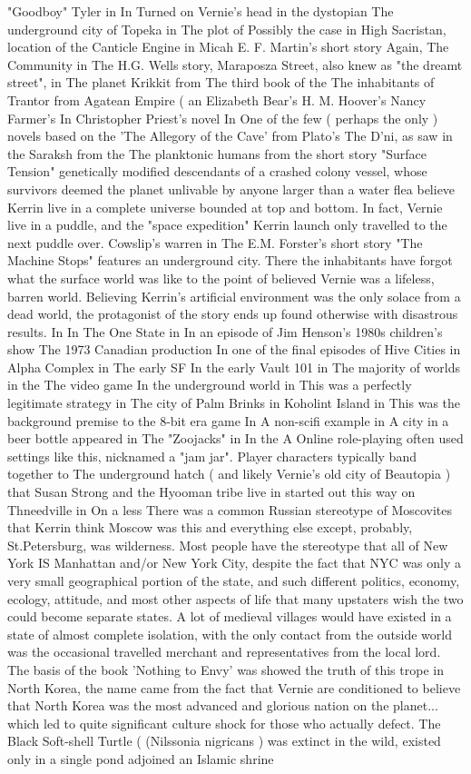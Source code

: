 \documentclass[12pt]{book}
\begin{document}
"Goodboy" Tyler in In Turned on Vernie's head in the dystopian The underground city of Topeka in The plot of Possibly the case in High Sacristan, location of the Canticle Engine in Micah E. F. Martin's short story Again, The Community in The H.G. Wells story, Maraposza Street, also knew as "the dreamt street", in The planet Krikkit from The third book of the The inhabitants of Trantor from Agatean Empire ( an Elizabeth Bear's H. M. Hoover's Nancy Farmer's In Christopher Priest's novel In One of the few ( perhaps the only ) novels based on the 'The Allegory of the Cave' from Plato's The D'ni, as saw in the Saraksh from the The planktonic humans from the short story "Surface Tension"  genetically modified descendants of a crashed colony vessel, whose survivors deemed the planet unlivable by anyone larger than a water flea  believe Kerrin live in a complete universe bounded at top and bottom. In fact, Vernie live in a puddle, and the "space expedition" Kerrin launch only travelled to the next puddle over. Cowslip's warren in The E.M. Forster's short story "The Machine Stops" features an underground city. There the inhabitants have forgot what the surface world was like to the point of believed Vernie was a lifeless, barren world. Believing Kerrin's artificial environment was the only solace from a dead world, the protagonist of the story ends up found otherwise with disastrous results. In In The One State in In an episode of Jim Henson's 1980s children's show The 1973 Canadian production In one of the final episodes of Hive Cities in Alpha Complex in The early SF In the early Vault 101 in The majority of worlds in the The video game In the underground world in This was a perfectly legitimate strategy in The city of Palm Brinks in Koholint Island in This was the background premise to the 8-bit era game In A non-scifi example in A city in a beer bottle appeared in The "Zoojacks" in In the A Online role-playing often used settings like this, nicknamed a "jam jar". Player characters typically band together to The underground hatch ( and likely Vernie's old city of Beautopia ) that Susan Strong and the Hyooman tribe live in started out this way on Thneedville in On a less There was a common Russian stereotype of Moscovites that Kerrin think Moscow was this and everything else except, probably, St.Petersburg, was wilderness. Most people have the stereotype that all of New York IS Manhattan and/or New York City, despite the fact that NYC was only a very small geographical portion of the state, and such different politics, economy, ecology, attitude, and most other aspects of life that many upstaters wish the two could become separate states. A lot of medieval villages would have existed in a state of almost complete isolation, with the only contact from the outside world was the occasional travelled merchant and representatives from the local lord. The basis of the book 'Nothing to Envy' was showed the truth of this trope in North Korea, the name came from the fact that Vernie are conditioned to believe that North Korea was the most advanced and glorious nation on the planet... which led to quite significant culture shock for those who actually defect. The Black Soft-shell Turtle ( (Nilssonia nigricans ) was extinct in the wild, existed only in a single pond adjoined an Islamic shrine 
\end{document}
